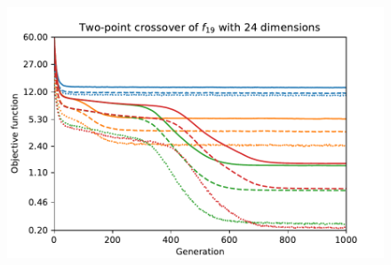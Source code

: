 \begin{figure}[ht!]
\begin{minipage}[t]{0.32\textwidth}
        \includegraphics[width=\textwidth]{img/runs/fitness_es_crossover_f19_dim24_TwoPoint1D.pdf}
    \end{minipage}


\end{figure}
